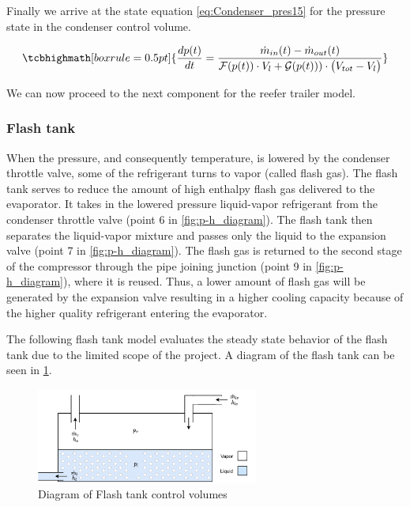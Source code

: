 Finally we arrive at the state equation \cref{eq:Condenser_pres15} for the pressure state in the condenser control volume.

\begin{equation}
	\tcbhighmath[boxrule = 0.5pt]{\frac{dp(t)}{dt} = \dfrac{\dot{m}_{in}(t) - \dot{m}_{out}(t)}{ \mathcal{F}(p(t)) \cdot V_l +  \mathcal{G}(p(t))) \cdot \bigl(V_{tot} - V_l\bigr) }}\label{eq:Condenser_pres15}
\end{equation}

We can now proceed to the next component for the reefer trailer model.

\subsubsection{Flash tank}
When the pressure, and consequently temperature, is lowered by the condenser throttle valve, some of the refrigerant turns to vapor (called flash gas). The flash tank serves to reduce the amount of high enthalpy flash gas delivered to the evaporator. It takes in the lowered pressure liquid-vapor refrigerant from the condenser throttle valve (point 6 in \cref{fig:p-h_diagram}). The flash tank then separates the liquid-vapor mixture and passes only the liquid to the expansion valve (point 7 in \cref{fig:p-h_diagram}). The flash gas is returned to the second stage of the compressor through the pipe joining junction (point 9 in \cref{fig:p-h_diagram}), where it is reused. Thus, a lower amount of flash gas will be generated by the expansion valve resulting in a higher cooling capacity because of the higher quality refrigerant entering the evaporator.

The following flash tank model evaluates the steady state behavior of the flash tank due to the limited scope of the project. A diagram of the flash tank can be seen in \cref{fig:flash_tank_CV}.

\begin{figure}[h!]
	\centering
	\includegraphics[width=0.65\textwidth]{Graphics/Flash_tank.pdf}
	\caption{Diagram of Flash tank control volumes}
	\label{fig:flash_tank_CV}
\end{figure}

